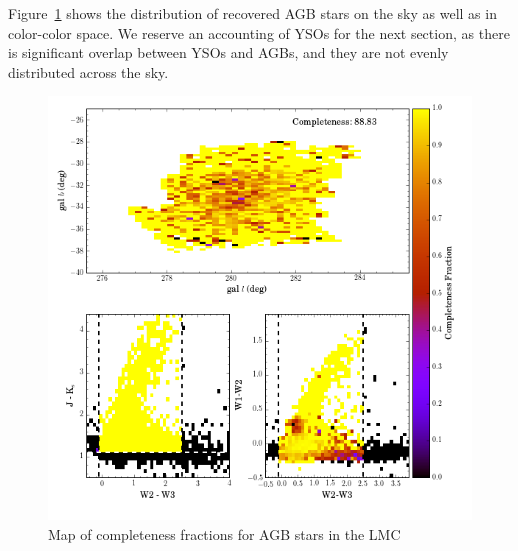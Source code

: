 \begin{table}[h]
	\begin{center}
	\caption{Sample contamination and completeness (\emph{bold}) with respect to each successive cut on WISE-2MASS color.\label{tab:criteria_completeness_contamination}}
	\end{center}
\end{table}

Figure~\ref{fig:lmc_completeness} shows the distribution of recovered AGB stars on the sky as well as in color-color space. We reserve an accounting of YSOs for the next section, as there is significant overlap between YSOs and AGBs, and they are not evenly distributed across the sky.

\begin{figure}[h]
\includegraphics[width=6in]{figs/ogle_completeness_map.png}
\caption{Map of completeness fractions for AGB stars in the LMC \label{fig:lmc_completeness}}
\end{figure}

